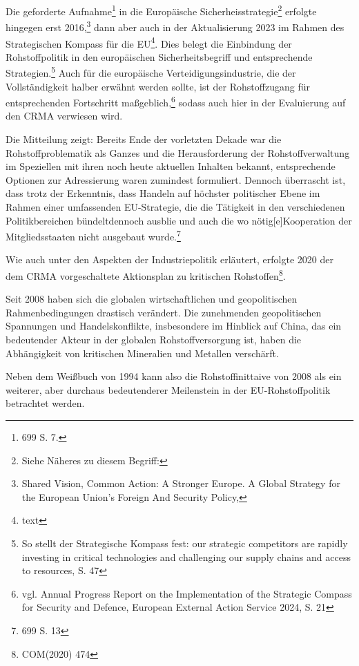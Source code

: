 \documentclass[12pt,a4paper,oneside]{book} %
\begin{document}
Die geforderte Aufnahme\footnote{699 S. 7.} in die Europäische Sicherheisstrategie\footnote{Siehe Näheres zu diesem Begriff:} erfolgte hingegen erst 2016,\footnote{Shared Vision, Common Action:
A Stronger Europe. A Global Strategy for the European Union’s Foreign And Security Policy,} dann aber auch in der Aktualisierung 2023 im Rahmen des \glqq Strategischen Kompass für die EU\grqq\footnote{text}. Dies belegt die Einbindung der Rohstoffpolitik in den europäischen Sicherheitsbegriff und entsprechende Strategien.\footnote{So stellt der Strategische Kompass fest: \glqq our strategic competitors are rapidly investing in critical technologies and challenging our supply chains and access to resources\grqq, S. 47} Auch für die europäische Verteidigungsindustrie, die der Vollständigkeit halber erwähnt werden sollte, ist der Rohstoffzugang für entsprechenden Fortschritt maßgeblich,\footnote{vgl. Annual Progress Report on the Implementation of the Strategic Compass for Security and Defence, European External Action Service 2024, S. 21} sodass auch hier in der Evaluierung auf den CRMA verwiesen wird.

Die Mitteilung zeigt: Bereits Ende der vorletzten Dekade war die Rohstoffproblematik als Ganzes und die Herausforderung der Rohstoffverwaltung im Speziellen mit ihren noch heute aktuellen Inhalten bekannt, entsprechende Optionen zur Adressierung waren zumindest formuliert. Dennoch überrascht ist, dass trotz der Erkenntnis, dass Handeln \glqq auf höchster politischer Ebene im Rahmen einer umfassenden EU-Strategie, die die Tätigkeit in den verschiedenen Politikbereichen bündelt\grqq dennoch ausblie und auch die \glqq wo nötig[e]\grqq Kooperation der Mitgliedsstaaten nicht ausgebaut wurde.\footnote{699 S. 13}

Wie auch unter den Aspekten der Industriepolitik erläutert, erfolgte 2020 der dem CRMA vorgeschaltete Aktionsplan zu kritischen Rohstoffen\footnote{COM(2020) 474}.


Seit 2008 haben sich die globalen wirtschaftlichen und geopolitischen Rahmenbedingungen drastisch verändert. Die zunehmenden geopolitischen Spannungen und Handelskonflikte, insbesondere im Hinblick auf China, das ein bedeutender Akteur in der globalen Rohstoffversorgung ist, haben die Abhängigkeit von kritischen Mineralien und Metallen verschärft. 
	
Neben dem Weißbuch von 1994 kann also die Rohstoffinittaive von 2008 als ein weiterer, aber durchaus bedeutenderer Meilenstein in der EU-Rohstoffpolitik betrachtet werden.
	
\end{document}
